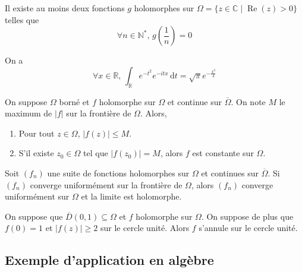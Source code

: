   \begin{cexample}
    Il existe au moins deux fonctions $g$ holomorphes sur $\Omega = \{ z \in \mathbb{C} \mid \operatorname{Re}(z) > 0 \}$ telles que
    \[ \forall n \in \mathbb{N}^*, \, g\left( \frac{1}{n} \right) = 0 \]
  \end{cexample}


  \begin{application}
    On a
    \[ \forall x \in \mathbb{R}, \, \int_{\mathbb{R}} e^{-t^2} e^{-itx} \, \mathrm{d}t = \sqrt{\pi} e^{-\frac{x^2}{4}} \]
  \end{application}


  \begin{theorem}
    On suppose $\Omega$ borné et $f$ holomorphe sur $\Omega$ et continue sur $\overline{\Omega}$. On note $M$ le maximum de $\vert f \vert$ sur la frontière de $\Omega$. Alors,
    \begin{enumerate}[label={\bfseries(\roman*)}]
      \item Pour tout $z \in \Omega$, $\vert f(z) \vert \leq M$.
      \item S'il existe $z_0 \in \Omega$ tel que $\vert f(z_0) \vert = M$, alors $f$ est constante sur $\Omega$.
    \end{enumerate}
  \end{theorem}


  \begin{application}
    Soit $(f_n)$ une suite de fonctions holomorphes sur $\Omega$ et continues sur $\overline{\Omega}$. Si $(f_n)$ converge uniformément sur la frontière de $\Omega$, alors $(f_n)$ converge uniformément sur $\Omega$ et la limite est holomorphe.
  \end{application}

  \begin{application}
    On suppose que $\overline{D}(0,1) \subseteq \Omega$ et $f$ holomorphe sur $\Omega$. On suppose de plus que $f(0) = 1$ et $\vert f(z) \vert \geq 2$ sur le cercle unité. Alors $f$ s'annule sur le cercle unité.
  \end{application}

  \subsection{Exemple d'application en algèbre}

